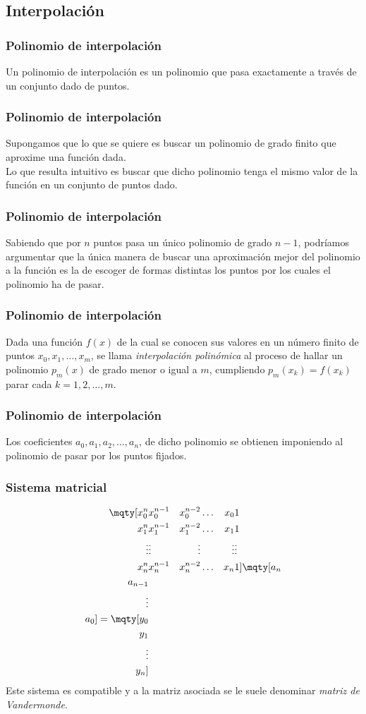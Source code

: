 \subsection{Interpolación}
\begin{frame}
\frametitle{Polinomio de interpolación}
Un polinomio de interpolación es un polinomio que pasa exactamente a través de un conjunto dado de puntos.
\end{frame}
\begin{frame}
\frametitle{Polinomio de interpolación}
Supongamos que lo que se quiere es buscar un polinomio de grado finito que aproxime una función dada.
\\
\bigskip
\pause
Lo que resulta intuitivo es buscar que dicho polinomio tenga el mismo valor de la función en un conjunto de puntos dado.
\end{frame}
\begin{frame}
\frametitle{Polinomio de interpolación}
Sabiendo que por $n$ puntos pasa un único polinomio de grado $n-1$, podríamos argumentar que la única manera de buscar una aproximación mejor del polinomio a la función es la de escoger de formas distintas los puntos por los cuales el polinomio ha de pasar.
\end{frame}
\begin{frame}
\frametitle{Polinomio de interpolación}
Dada una función $f(x)$ de la cual se conocen sus valores en un número finito de puntos $x_{0}, x_{1}, \ldots, x_{m}$, se llama \emph{interpolación polinómica} al proceso de hallar un polinomio $p_{m}(x)$ de grado menor o igual a $m$, cumpliendo $p_{m}(x_{k}) = f(x_{k})$ parar cada $k = 1, 2, \ldots, m$.
\end{frame}
\begin{frame}
\frametitle{Polinomio de interpolación}
Los coeficientes $a_{0}, a_{1}, a_{2}, \ldots, a_{n}$, de dicho polinomio se obtienen imponiendo al polinomio de pasar por los puntos fijados.
\end{frame}
\begin{frame}
\frametitle{Sistema matricial}
\begin{align*}
\mqty[
x_{0}^{n} & x_{0}^{n-1} & x_{0}^{n-2} & \ldots & x_{0} & 1 \\
x_{1}^{n} & x_{1}^{n-1} & x_{1}^{n-2} & \ldots & x_{1} & 1 \\
\vdots & \vdots & \vdots & & \vdots & \vdots \\
x_{n}^{n} & x_{n}^{n-1} & x_{n}^{n-2} & \ldots & x_{n} & 1 
]
\mqty[
a_{n} \\ a_{n-1} \\ \vdots \\ a_{0}
]
=
\mqty[
y_{0} \\ y_{1} \\ \vdots \\ y_{n}
]
\end{align*}
\pause
Este sistema es compatible y a la matriz asociada se le suele denominar \emph{matriz de Vandermonde}.
\end{frame}
